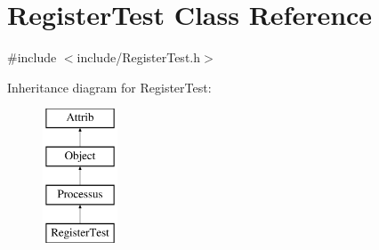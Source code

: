 \hypertarget{classRegisterTest}{}\section{Register\+Test Class Reference}
\label{classRegisterTest}


{\ttfamily \#include $<$include/\+Register\+Test.\+h$>$}

Inheritance diagram for Register\+Test\+:\begin{figure}[H]
\begin{center}
\leavevmode
\includegraphics[height=4.000000cm]{classRegisterTest}
\end{center}
\end{figure}
